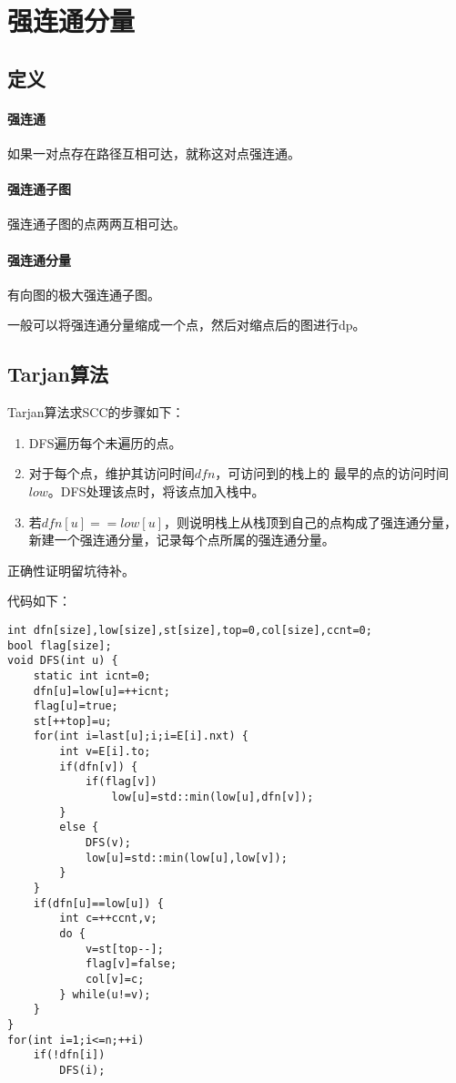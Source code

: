 \section{强连通分量}
\subsection{定义}
\paragraph{强连通} 如果一对点存在路径互相可达，就称这对点强连通。
\paragraph{强连通子图} 强连通子图的点两两互相可达。
\paragraph{强连通分量} 有向图的极大强连通子图。

一般可以将强连通分量缩成一个点，然后对缩点后的图进行dp。
\subsection{Tarjan算法}
Tarjan算法求SCC的步骤如下：

\begin{enumerate}
	\item DFS遍历每个未遍历的点。
	\item 对于每个点，维护其访问时间$dfn$，可访问到的栈上的
	      最早的点的访问时间$low$。DFS处理该点时，将该点加入栈中。
	\item 若$dfn[u]==low[u]$，则说明栈上从栈顶到自己的点构成了强连通分量，
	      新建一个强连通分量，记录每个点所属的强连通分量。
\end{enumerate}

正确性证明留坑待补。

代码如下：
\begin{lstlisting}
int dfn[size],low[size],st[size],top=0,col[size],ccnt=0;
bool flag[size];
void DFS(int u) {
    static int icnt=0;
    dfn[u]=low[u]=++icnt;
    flag[u]=true;
    st[++top]=u;
    for(int i=last[u];i;i=E[i].nxt) {
        int v=E[i].to;
        if(dfn[v]) {
            if(flag[v])
                low[u]=std::min(low[u],dfn[v]);
        }
        else {
            DFS(v);
            low[u]=std::min(low[u],low[v]);
        }
    }
    if(dfn[u]==low[u]) {
        int c=++ccnt,v;
        do {
            v=st[top--];
            flag[v]=false;
            col[v]=c;
        } while(u!=v);
    }
}
for(int i=1;i<=n;++i)
    if(!dfn[i])
        DFS(i);
\end{lstlisting}
